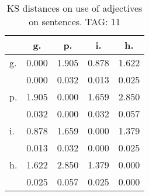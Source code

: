 \begin{table}[h!]
\begin{center}
\begin{tabular}{| l | c | c | c | c |}\hline
 & g. & p. & i. & h. \\\hline
g. & 0.000  & 1.905  & 0.878  & 1.622 \\\hline
 & 0.000  & 0.032  & 0.013  & 0.025 \\\hline
p. & 1.905  & 0.000  & 1.659  & 2.850 \\\hline
 & 0.032  & 0.000  & 0.032  & 0.057 \\\hline
i. & 0.878  & 1.659  & 0.000  & 1.379 \\\hline
 & 0.013  & 0.032  & 0.000  & 0.025 \\\hline
h. & 1.622  & 2.850  & 1.379  & 0.000 \\\hline
 & 0.025  & 0.057  & 0.025  & 0.000 \\\hline
\end{tabular}
\caption{KS distances on use of adjectives on sentences. TAG: 11}
\end{center}
\end{table}